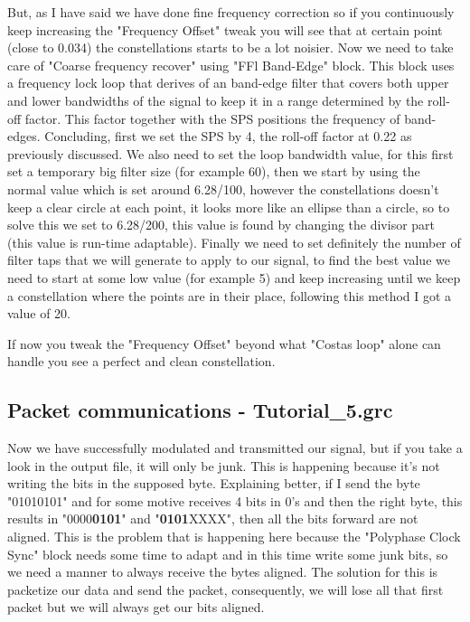 \documentclass[a4paper, 10pt, conference]{ieeeconf}      %
\begin{document}
    But, as I have said we have done fine frequency correction so if you continuously keep increasing the "Frequency Offset" tweak you will see that at certain point (close to 0.034) the constellations starts to be a lot noisier. Now we need to take care of "Coarse frequency recover" using "FFl Band-Edge" block. This block uses a frequency lock loop that derives of an band-edge filter that covers both upper and lower bandwidths of the signal to keep it in a range determined by the roll-off factor. This factor together with the SPS positions the frequency of band-edges.
    Concluding, first we set the SPS by 4, the roll-off factor at 0.22 as previously discussed. We also need to set the loop bandwidth value, for this first set a temporary big filter size (for example 60), then we start by using the normal value which is set around 6.28/100, however the constellations doesn't keep a clear circle at each point, it looks more like an ellipse than a circle, so to solve this we set to 6.28/200, this value is found by changing the divisor part (this value is run-time adaptable). Finally we need to set definitely the number of filter taps that we will generate to apply to our signal, to find the best value we need to start at some low value (for example 5) and keep increasing until we keep a constellation where the points are in their place, following this method I got a value of 20.
    
    If now you tweak the "Frequency Offset" beyond what "Costas loop" alone can handle you see a perfect and clean constellation. 

\subsection{Packet communications - Tutorial\_5.grc}
    Now we have successfully modulated and transmitted our signal, but if you take a look in the output file, it will only be junk. This is happening because it's not writing the bits in the supposed byte. Explaining better, if I send the byte "01010101" and for some motive receives 4 bits in 0's and then the right byte, this results in "0000\textbf{0101}" and "\textbf{0101}XXXX", then all the bits forward are not aligned. This is the problem that is happening here because the "Polyphase Clock Sync" block needs some time to adapt and in this time write some junk bits, so we need a manner to always receive the bytes aligned. The solution for this is packetize our data and send the packet, consequently, we will lose all that first packet but we will always get our bits aligned.
    
\end{document}
